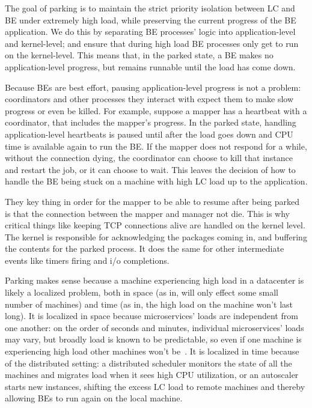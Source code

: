 The goal of parking is to maintain the strict priority isolation between LC and
BE under extremely high load, while preserving the current progress of the BE
application. We do this by separating BE processes' logic into application-level
and kernel-level; and ensure that during high load BE processes only get to run
on the kernel-level. This means that, in the parked state, a BE makes no
application-level progress, but remains runnable until the load has come
down.

Because BEs are best effort, pausing application-level progress is not a
problem: coordinators and other processes they interact with expect them to make
slow progress or even be killed. For example, suppose a mapper has a heartbeat
with a coordinator, that includes the mapper's progress. In the parked state,
handling application-level heartbeats is paused until after the load goes down
and CPU time is available again to run the BE. If the mapper does not respond
for a while, without the connection dying, the coordinator can choose to kill
that instance and restart the job, or it can choose to wait. This leaves the
decision of how to handle the BE being stuck on a machine with high LC load up
to the application.

They key thing in order for the mapper to be able to resume after being parked
is that the connection between the mapper and manager not die. This is why
critical things like keeping TCP connections alive are handled on the kernel
level. The kernel is responsible for acknowledging the packages coming in, and
buffering the contents for the parked process. It does the same for other
intermediate events like timers firing and i/o completions.

Parking makes sense because a machine experiencing high load in a datacenter is
likely a localized problem, both in space (as in, will only effect some small
number of machines) and time (as in, the high load on the machine won't last
long). It is localized in space because microservices' loads are independent
from one another: on the order of seconds and minutes, individual microservices'
loads may vary, but broadly load is known to be predictable, so even if one
machine is experiencing high load other machines won't be~\cite{TODO}. It is
localized in time because of the distributed setting: a distributed scheduler
monitors the state of all the machines and migrates load when it sees high CPU
utilization, or an autoscaler starts new instances, shifting the excess LC load
to remote machines and thereby allowing BEs to run again on the local machine.